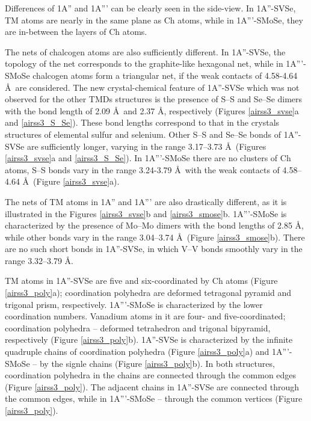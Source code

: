 \documentclass[a4paperm]{article}
\begin{document}
Differences of 1A'' and 1A''' can be clearly seen in the side-view.
In 1A''-SVSe, TM atoms are nearly in the same plane as Ch atoms, while in 1A'''-SMoSe,  they are in-between the layers of Ch atoms.

The nets of chalcogen atoms are also sufficiently different.
In 1A''-SVSe, the topology of the net corresponds to the graphite-like hexagonal net, while in 1A'''-SMoSe chalcogen atoms form a triangular net, if the weak contacts of 4.58-4.64 \AA\ are considered.
The new crystal-chemical feature of 1A''-SVSe which was not observed for the other TMDs structures is the presence of S--S and Se--Se dimers with the bond length of 2.09 \AA\ and 2.37 \AA, respectively (Figures \ref{airss3_svse}a and \ref{airss3_S_Se}).
These bond lengths correspond to that in the crystals structures of elemental sulfur and selenium.
Other S--S and Se--Se bonds of 1A''-SVSe are  sufficiently longer, varying in the range 3.17--3.73 \AA\ (Figures \ref{airss3_svse}a and \ref{airss3_S_Se}).
In 1A'''-SMoSe there are no clusters of Ch atoms, S--S bonds vary in the range 3.24-3.79 \AA\ with the weak contacts of 4.58--4.64 \AA\ (Figure \ref{airss3_svse}a).

The nets of TM atoms in 1A'' and 1A''' are also drastically different, as it is illustrated in the Figures \ref{airss3_svse}b and \ref{airss3_smose}b.
1A'''-SMoSe is characterized by the presence of Mo--Mo dimers with the bond lengths of 2.85 \AA, while other bonds vary in the range 3.04--3.74 \AA\ (Figure \ref{airss3_smose}b).
There are no such short bonds in 1A''-SVSe, in which V--V bonds smoothly vary in the range 3.32--3.79 \AA.

TM atoms in 1A''-SVSe are five and six-coordinated by Ch atoms (Figure \ref{airss3_poly}a);
coordination polyhedra are  deformed tetragonal pyramid and trigonal prism, respectively.
1A'''-SMoSe is characterized by the lower coordination numbers.
Vanadium atoms in it are four- and five-coordinated; coordination polyhedra -- deformed tetrahedron and trigonal bipyramid, respectively (Figure \ref{airss3_poly}b).
1A''-SVSe is characterized by the infinite quadruple chains of coordination polyhedra (Figure \ref{airss3_poly}a) and 1A'''-SMoSe -- by the signle chains (Figure \ref{airss3_poly}b).
In both structures, coordination polyhedra in the chains are connected through the common edges (Figure \ref{airss3_poly}).
The adjacent chains in 1A''-SVSe are connected through the common edges, while in 1A'''-SMoSe -- through the common vertices (Figure \ref{airss3_poly}).
\end{document}
